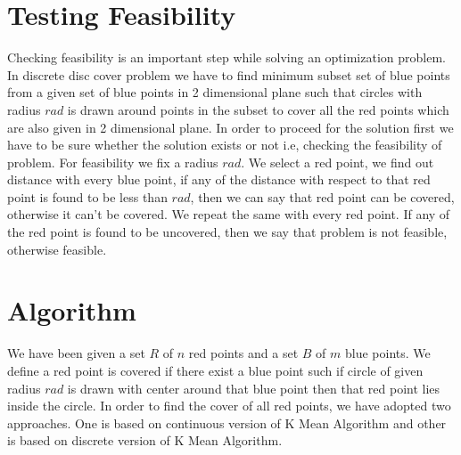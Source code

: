 \documentclass[12pt,a4wide]{report}
\theoremstyle{plain}
\theoremstyle{definition}
\theoremstyle{remark}
\begin{document}
\section{Testing  Feasibility}
Checking feasibility is an important step while solving an optimization problem. In discrete disc cover problem
we have to find minimum subset set of blue points from a given set of blue points in 2 dimensional plane such that circles with 
radius $rad$ is drawn around points in the subset to cover all the red points which are also given in 2 dimensional plane. In order 
to proceed for the solution first we have to be sure whether the solution exists or not i.e, checking the feasibility of problem.
For feasibility we fix a radius $rad$. We select a red point, we find out distance with every blue point, if any of the distance
with respect to that red point is found to be less than $rad$, then we can say that red point can be covered, otherwise it can't
be covered. We repeat the same with every red point. If any of the red point is found to be uncovered, then we say that problem
is not feasible, otherwise feasible.\\
\clearpage
\section{Algorithm}
We have been given a set $R$ of $n$ red points and a set $B$ of $m$ blue points. We define a red point is covered if there
exist a blue point such if circle of given radius $rad$ is drawn with center around that blue point then that red point lies inside
the circle. In order to find the cover of all red points, we have adopted two approaches. One is based on continuous version of K Mean Algorithm and other is based on discrete version of K Mean
Algorithm.\\ 
\end{document}
